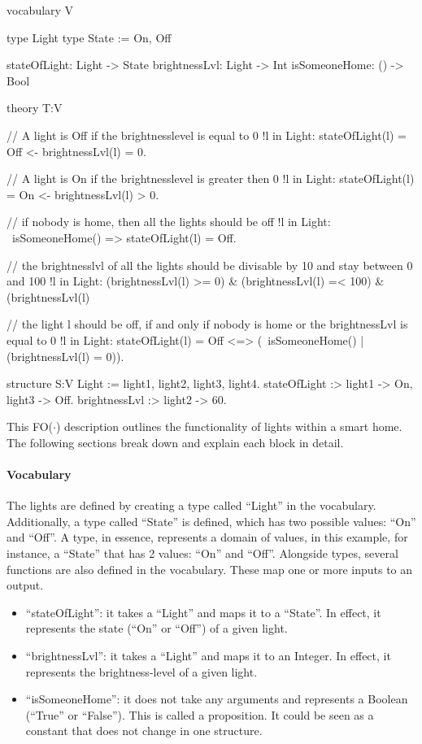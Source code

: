 \documentclass[11pt,a4paper]{report}
\newcommand{\fodot}{FO($\cdot$)\xspace}
\begin{document}
\begin{idplisting}
vocabulary V {
    type Light
    type State := {On, Off}
    
    stateOfLight: Light -> State
    brightnessLvl: Light -> Int
    isSomeoneHome: () -> Bool
}

theory T:V {
    {
       // A light is Off if the brightnesslevel is equal to 0
       !l in Light: stateOfLight(l) = Off <- brightnessLvl(l) = 0.
       
       // A light is On if the brightnesslevel is greater then 0
       !l in Light: stateOfLight(l) = On <- brightnessLvl(l) > 0.
    }
    
    // if nobody is home, then all the lights should be off
    !l in Light: ~isSomeoneHome() => stateOfLight(l) = Off.
    
    // the brightnesslvl of all the lights should be divisable by 10 and stay between 0 and 100
    !l in Light: (brightnessLvl(l) >= 0) & (brightnessLvl(l) =< 100) & (brightnessLvl(l) %
    
    // the light l should be off, if and only if nobody is home or the brightnessLvl is equal to 0
    !l in Light: stateOfLight(l) = Off <=> (~isSomeoneHome() | (brightnessLvl(l) = 0)).
}

structure S:V {
    Light := {light1, light2, light3, light4}.
    stateOfLight :> {light1 -> On, light3 -> Off}.
    brightnessLvl :> {light2 -> 60}.
}


\end{idplisting}
This \fodot description outlines the functionality of lights within a smart home. The following sections break down and explain each block in detail.

\paragraph{Vocabulary}
The lights are defined by creating a type called ``Light'' in the vocabulary. Additionally, a type called ``State'' is defined, which has two possible values: ``On'' and ``Off''. A type, in essence, represents a domain of values, in this example, for instance, a ``State'' that has 2 values: ``On'' and ``Off''. Alongside types, several functions are also defined in the vocabulary. These map one or more inputs to an output.
\begin{itemize}
    \item ``stateOfLight'': it takes a ``Light'' and maps it to a ``State''. In effect, it represents the state (``On'' or ``Off'') of a given light.
    \item ``brightnessLvl'': it takes a ``Light'' and maps it to an Integer. In effect, it represents the brightness-level of a given light.
    \item ``isSomeoneHome'': it does not take any arguments and represents a Boolean (``True'' or ``False''). This is called a proposition. It could be seen as a constant that does not change in one structure.
\end{itemize}
\end{document}
